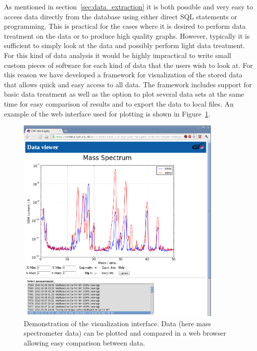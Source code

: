 As mentioned in section~\ref{sec:data_extraction} it is both possible and very
easy to access data directly from the database using either direct SQL
statements or programming. This is practical for the cases where it is
desired to perform data treatment on the data or to produce high quality
graphs. However, typically it is sufficient to simply look at the data
and possibly perform light data treatment. For this kind of data analysis it
would be highly impractical to write small custom pieces of software for each
kind of data that the users wish to look at. For this reason we have developed
a framework for visualization of the stored data that allows quick and easy
access to all data. The framework includes support for basic data treatment as
well as the option to plot several data sets at the same time for easy
comparison of results and to export the data to local files. An example of the
web interface used for plotting is shown in Figure~\ref{fig:webinterface}.
\begin{figure}
 \begin{center}
 \includegraphics[width=10cm]{mass_spectra_comparison.png}
 \caption{Demonstration of the visualization interface. Data (here mass
   spectrometer data) can be plotted and compared in a web browser allowing
   easy comparison between data. \label{fig:webinterface}
 } 
 \end{center}
\end{figure}

